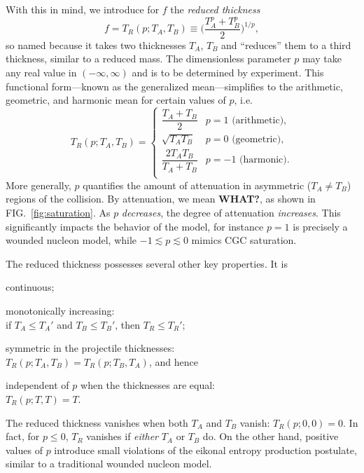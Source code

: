 \documentclass[aps,prl,reprint,amsmath,nofootinbib]{revtex4-1}
\begin{document}
With this in mind, we introduce for $f$ the \emph{reduced thickness}
\begin{equation}
  f = T_R(p; T_A, T_B) \equiv \biggl( \frac{T_A^p + T_B^p}{2} \biggr)^{1/p},
  \label{eq:tr}
\end{equation}
so named because it takes two thicknesses $T_A$, $T_B$ and ``reduces'' them to a third thickness, similar to a
reduced mass.  The dimensionless parameter $p$ may take any real value in $(-\infty, \infty)$ and is to be
determined by experiment.  This functional form---known as the generalized mean---simplifies to the arithmetic,
geometric, and harmonic mean for certain values of $p$, i.e.
\begin{equation}
  T_R(p; T_A, T_B) =
  \begin{cases}
    \dfrac{T_A + T_B}{2} & p = 1 \text{ (arithmetic)}, \\[2ex]
    \sqrt{T_A T_B} & p = 0 \text{ (geometric)}, \\[2ex]
    \dfrac{2 T_A T_B}{T_A + T_B} & p = -1 \text{ (harmonic)}. \\
  \end{cases}
\end{equation}
More generally, $p$ quantifies the amount of attenuation in asymmetric ($T_A \neq T_B$) regions of the
collision.  By attenuation, we mean \textbf{WHAT?}, as shown in FIG.~\ref{fig:saturation}.  As $p$
\emph{decreases}, the degree of attenuation \emph{increases}.  This significantly impacts the behavior of the
model, for instance $p=1$ is precisely a wounded nucleon model, while $-1 \lesssim p \lesssim 0$ mimics CGC
saturation.

The reduced thickness possesses several other key properties.  It is
\begin{itemize*}
  \item continuous;
  \item monotonically increasing:  \\
    if $T_A \leq T_A'$ and $T_B \leq T_B'$, then $T_R \leq T_R'$;
  \item symmetric in the projectile thicknesses: \\
    $T_R(p; T_A, T_B) = T_R(p; T_B, T_A)$, and hence
  \item independent of $p$ when the thicknesses are equal: \\
    $T_R(p; T, T) = T$.
  \item The reduced thickness vanishes when both $T_A$ and $T_B$ vanish: $T_R(p; 0, 0) = 0$.  In fact, for $p
    \leq 0$, $T_R$ vanishes if \emph{either} $T_A$ or $T_B$ do.  On the other hand, positive values of $p$
    introduce small violations of the eikonal entropy production postulate, similar to a traditional wounded
    nucleon model.
\end{itemize*}
\end{document}
